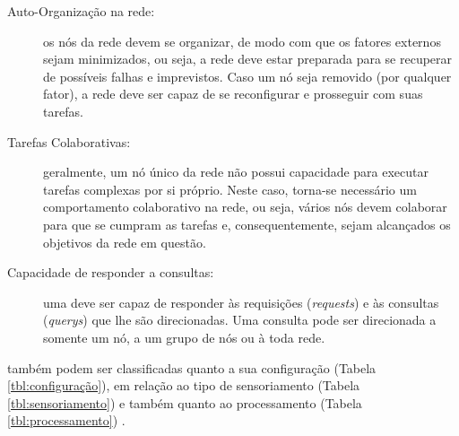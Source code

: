 \begin{description}
	\item[Auto-Organização na rede: ] os nós da rede devem se organizar, de modo com que os fatores externos sejam minimizados, ou seja, a rede deve estar preparada para se recuperar de possíveis falhas e imprevistos. Caso um nó seja removido (por qualquer fator), a rede deve ser capaz de se reconfigurar e prosseguir com suas tarefas.

	\item[Tarefas Colaborativas: ] geralmente, um nó único da rede não possui capacidade para executar tarefas complexas por si próprio. Neste caso, torna-se necessário um comportamento colaborativo na rede, ou seja, vários nós devem colaborar para que se cumpram as tarefas e, consequentemente, sejam alcançados os objetivos da rede em questão.

	\item[Capacidade de responder a consultas: ] uma \rssf deve ser capaz de responder às requisições (\emph{requests}) e às consultas (\emph{querys}) que lhe são direcionadas. Uma consulta pode ser direcionada a somente um nó, a um grupo de nós ou à toda rede.

\end{description}

\rssfs também podem ser classificadas quanto a sua configuração (Tabela \ref{tbl:configuração}), em relação ao tipo de sensoriamento (Tabela \ref{tbl:sensoriamento}) e também quanto ao processamento (Tabela \ref{tbl:processamento}) \cite{Ruiz2004}.

\pagebreak

